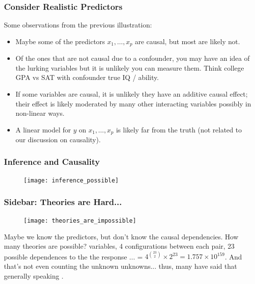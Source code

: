 \documentclass[slides]{beamer} %
\begin{document}
\begin{frame}\frametitle{Consider Realistic Predictors}

Some observations from the previous illustration:\pause

\begin{itemize}
\item Maybe some of the predictors $x_1, \ldots, x_p$ are causal, but most are likely not. \pause
\item Of the ones that are not causal due to a confounder, you may have an idea of the lurking variables but it is unlikely you can measure them. Think college GPA vs SAT with confounder true IQ / ability.\pause
\item If some variables are causal, it is unlikely they have an additive causal effect; their effect is likely moderated by many other interacting variables possibly in non-linear ways.\pause
\item A linear model for $y$ on $x_1, \ldots, x_p$ is likely far from the truth (not related to our discussion on causality).
\end{itemize}

\end{frame}

\begin{frame}\frametitle{Inference and Causality}

\begin{figure}
\centering
\texttt{[image: inference\_possible]}
\end{figure}

\end{frame}

\begin{frame}\frametitle{Sidebar: Theories are Hard...}
\begin{figure}
\centering
\texttt{[image: theories\_are\_impossible]}
\end{figure}

\footnotesize
Maybe we know the predictors, but don't know the causal dependencies. How many theories are possible?  variables, 4 configurations between each pair, 23 possible dependences to the the response ... = \pause $4^{\binom{23}{2}} \times 2^{23} = 1.757 \times 10^{159}$. And that's not even counting the unknown unknowns... thus, many have said that generally speaking  .

\end{frame}
\end{document}

